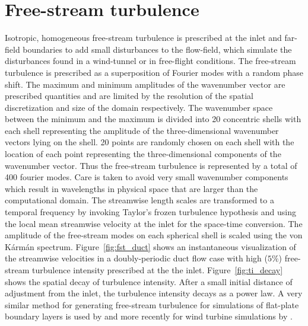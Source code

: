 \section{Free-stream turbulence}

Isotropic, homogeneous free-stream turbulence is prescribed at the inlet and far-field boundaries to add small disturbances to the flow-field, which simulate the disturbances found in a wind-tunnel or in free-flight conditions. The free-stream turbulence is prescribed as a superposition of Fourier modes with a random phase shift. The maximum and minimum amplitudes of the wavenumber vector are prescribed quantities and are limited by the resolution of the spatial discretization and size of the domain respectively. The wavenumber space between the minimum and the maximum is divided into 20 concentric shells with each shell representing the amplitude of the three-dimensional wavenumber vectors lying on the shell. 20 points are randomly chosen on each shell with the location of each point representing the three-dimensional components of the wavenumber vector. Thus the free-stream turbulence is represented by a total of 400 fourier modes. Care is taken to avoid very small wavenumber components which result in wavelengths in physical space that are larger than the computational domain. The streamwise length scales are transformed to a temporal frequency by invoking Taylor's frozen turbulence hypothesis and using the local mean streamwise velocity at the inlet for the space-time conversion. The amplitude of the free-stream modes on each spherical shell is scaled using the von K\'arm\'an spectrum. Figure~\ref{fig:fst_duct} shows an instantaneous visualization of the streamwise velocities in a doubly-periodic duct flow case with high ($5\%$) free-stream turbulence intensity prescribed at the the inlet. Figure~\ref{fig:ti_decay} shows the spatial decay of turbulence intensity. After a small initial distance of adjustment from the inlet, the turbulence intensity decays as a power law. A very similar method for generating free-stream turbulence for simulations of flat-plate boundary layers is used by \cite{schlatterdiploma,brandt04,schlatter08} and more recently for wind turbine simulations by \cite{kleusberglicenciate}.

